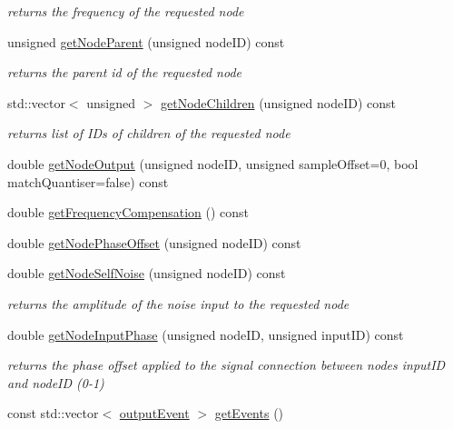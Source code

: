 \begin{DoxyCompactItemize}
\begin{DoxyCompactList}\small\item\em returns the frequency of the requested node \end{DoxyCompactList}\item 
unsigned \mbox{\hyperlink{classMatsuokaEngine_a5d808db0af62f65826f0fcbc47625205}{get\+Node\+Parent}} (unsigned node\+ID) const
\begin{DoxyCompactList}\small\item\em returns the parent id of the requested node \end{DoxyCompactList}\item 
std\+::vector$<$ unsigned $>$ \mbox{\hyperlink{classMatsuokaEngine_a8eb45ab4f1c523f979b3d44dd2c5e508}{get\+Node\+Children}} (unsigned node\+ID) const
\begin{DoxyCompactList}\small\item\em returns list of I\+Ds of children of the requested node \end{DoxyCompactList}\item 
double \mbox{\hyperlink{classMatsuokaEngine_a72ba599f12e55273f7298a70e7f0eff7}{get\+Node\+Output}} (unsigned node\+ID, unsigned sample\+Offset=0, bool match\+Quantiser=false) const
\item 
double \mbox{\hyperlink{classMatsuokaEngine_a87b0d0b8fe0447fba1fe7456dbea4e11}{get\+Frequency\+Compensation}} () const
\item 
double \mbox{\hyperlink{classMatsuokaEngine_a201de701852d315d3eac20c749b19752}{get\+Node\+Phase\+Offset}} (unsigned node\+ID) const
\item 
double \mbox{\hyperlink{classMatsuokaEngine_a6857e20e39f058a4145fdc4493df6583}{get\+Node\+Self\+Noise}} (unsigned node\+ID) const
\begin{DoxyCompactList}\small\item\em returns the amplitude of the noise input to the requested node \end{DoxyCompactList}\item 
double \mbox{\hyperlink{classMatsuokaEngine_a0f7aa58c722f9bce30724d4a62c72374}{get\+Node\+Input\+Phase}} (unsigned node\+ID, unsigned input\+ID) const
\begin{DoxyCompactList}\small\item\em returns the phase offset applied to the signal connection between nodes input\+ID and node\+ID (0-\/1) \end{DoxyCompactList}\item 
const std\+::vector$<$ \mbox{\hyperlink{classMatsuokaEngine_a09035e4918ce82c9378821c88375f843}{output\+Event}} $>$ \mbox{\hyperlink{classMatsuokaEngine_a70444163eee59d0df5b282bb8696f5a1}{get\+Events}} ()

\end{DoxyCompactItemize}

